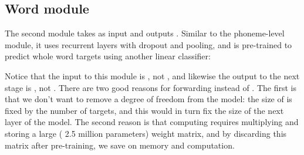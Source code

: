 \documentclass[a4paper]{article}
\begin{document}
\subsection{Word module}
The second module takes as input  and outputs . Similar to the phoneme-level module, it uses recurrent layers with dropout and pooling, and is pre-trained to predict whole word targets using another linear classifier:


Notice that the input to this module is , not , and likewise the output to the next stage is , not . There are two good reasons for forwarding  instead of . The first is that we don't want to remove a degree of freedom from the model: the size of  is fixed by the number of targets, and this would in turn fix the size of the next layer of the model. The second reason is that computing   requires multiplying and storing a large ( 2.5 million parameters) weight matrix, and by discarding this matrix after pre-training, we save on memory and computation.
\end{document}
